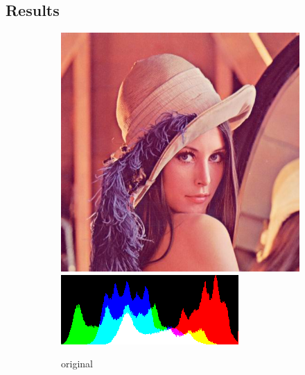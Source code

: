 \documentclass[12pt]{article}
\begin{document}
\subsection{Results}
\begin{figure}[H]\centering
    \begin{subfigure}[t]{\subfiguresize}\centering
        \includegraphics[width=\textwidth]{lenac.png}\\[1ex]
        \includegraphics[width=\textwidth]{lena_clear_histogram.png}
        \caption{original}
    \end{subfigure}
    \hspace{.05\textwidth}
    \begin{subfigure}[t]{\subfiguresize}\centering

\end{subfigure}
\end{figure}
\end{document}
